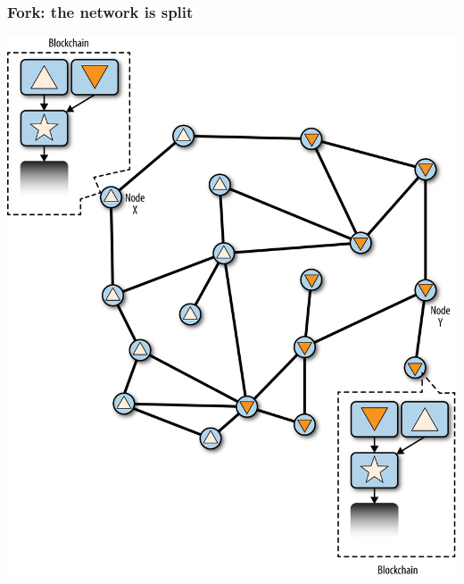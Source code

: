 \documentclass[11pt]{beamer}  %
\begin{document}
\begin{frame}\frametitle{Fork: the network is split}

  \begin{center}
    \includegraphics[scale=0.56,clip=false]{pictures/mbc2_1004.png}
  \end{center}

\end{frame}
\end{document}
